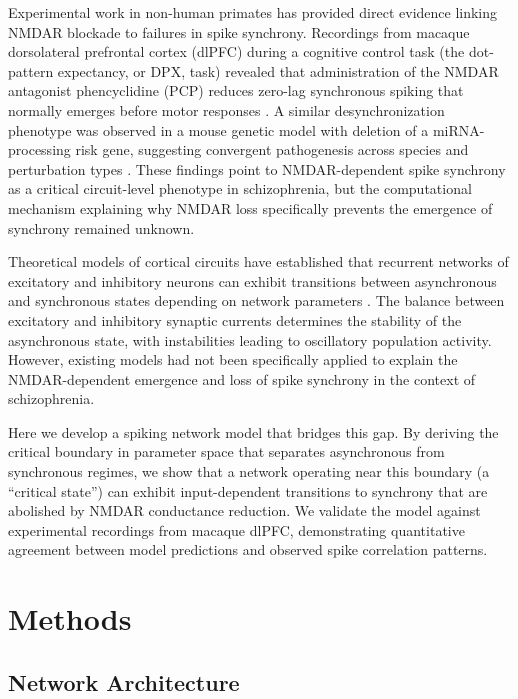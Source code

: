 \documentclass[11pt]{article}
\begin{document}
Experimental work in non-human primates has provided direct evidence linking NMDAR blockade to failures in spike synchrony. Recordings from macaque dorsolateral prefrontal cortex (dlPFC) during a cognitive control task (the dot-pattern expectancy, or DPX, task) revealed that administration of the NMDAR antagonist phencyclidine (PCP) reduces zero-lag synchronous spiking that normally emerges before motor responses \citep{zick2018blocking}. A similar desynchronization phenotype was observed in a mouse genetic model with deletion of a miRNA-processing risk gene, suggesting convergent pathogenesis across species and perturbation types \citep{kummerfeld2020dendritic}. These findings point to NMDAR-dependent spike synchrony as a critical circuit-level phenotype in schizophrenia, but the computational mechanism explaining why NMDAR loss specifically prevents the emergence of synchrony remained unknown.

Theoretical models of cortical circuits have established that recurrent networks of excitatory and inhibitory neurons can exhibit transitions between asynchronous and synchronous states depending on network parameters \citep{brunel2000dynamics, brunel2003fast}. The balance between excitatory and inhibitory synaptic currents determines the stability of the asynchronous state, with instabilities leading to oscillatory population activity. However, existing models had not been specifically applied to explain the NMDAR-dependent emergence and loss of spike synchrony in the context of schizophrenia.

Here we develop a spiking network model that bridges this gap. By deriving the critical boundary in parameter space that separates asynchronous from synchronous regimes, we show that a network operating near this boundary (a ``critical state'') can exhibit input-dependent transitions to synchrony that are abolished by NMDAR conductance reduction. We validate the model against experimental recordings from macaque dlPFC, demonstrating quantitative agreement between model predictions and observed spike correlation patterns.

\section{Methods}

\subsection{Network Architecture}
\end{document}
